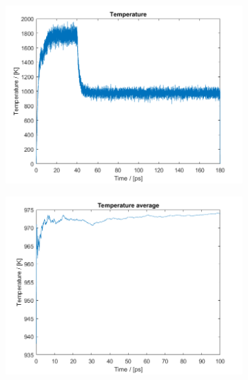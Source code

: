 \begin{figure}[H]
\begin{subfigure}[b]{0.40\textwidth}
        \includegraphics[width=\textwidth]{graphics/task4/temperature.png}
    \end{subfigure}
    \begin{subfigure}[b]{0.40\textwidth}
        \centering
        \includegraphics[width=\textwidth]{graphics/task4/temperature_avg.png}
    \end{subfigure}
    \begin{subfigure}[b]{0.40\textwidth}
        \centering

\end{subfigure}
\end{figure}

